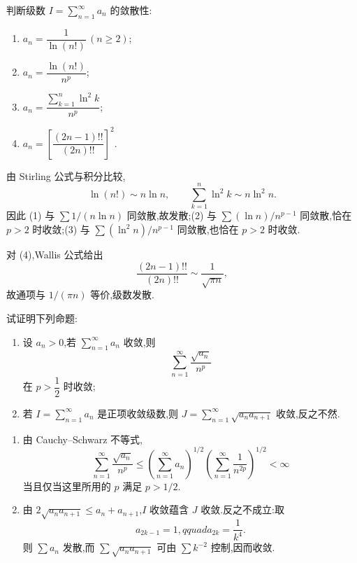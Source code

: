 \begin{example}
    判断级数 $\displaystyle I=\sum\limits_{n=1}^{\infty}a_n$ 的敛散性:
    \begin{enumerate}
        \item $\displaystyle a_n=\dfrac{1}{\ln(n!)}\,(n\geq2)$;
        \item $\displaystyle a_n=\dfrac{\ln(n!)}{n^p}$;
        \item $\displaystyle a_n=\dfrac{\displaystyle\sum\limits_{k=1}^n\ln^2k}{n^p}$;
        \item $\displaystyle a_n=\left[\dfrac{(2n-1)!!}{(2n)!!}\right]^2$.
    \end{enumerate}
\end{example}
\exampleblank

\begin{solution}
    由 Stirling 公式与积分比较,
    \[
        \ln(n!)\sim n\ln n,
        \qquad
        \sum\limits_{k=1}^{n}\ln^2k\sim n\ln^2n.
    \]
    因此 (1) 与 $\displaystyle \sum 1/(n\ln n)$ 同敛散,故发散;(2) 与
    $\displaystyle \sum (\ln n)/n^{p-1}$ 同敛散,恰在 $p>2$ 时收敛;(3) 与
    $\displaystyle \sum (\ln^2n)/n^{p-1}$ 同敛散,也恰在 $p>2$ 时收敛.

    对 (4),Wallis 公式给出
    \[
        \dfrac{(2n-1)!!}{(2n)!!}\sim\dfrac{1}{\sqrt{\pi n}},
    \]
    故通项与 $1/(\pi n)$ 等价,级数发散.
\end{solution}

\begin{example}
    试证明下列命题:
    \begin{enumerate}
        \item 设 $a_n>0$,若 $\displaystyle\sum\limits_{n=1}^{\infty}a_n$ 收敛,则
              \[
                  \displaystyle\sum\limits_{n=1}^{\infty}\dfrac{\sqrt{a_n}}{n^p}
              \]
              在 $p>\dfrac{1}{2}$ 时收敛;
        \item 若 $\displaystyle I=\sum\limits_{n=1}^{\infty}a_n$ 是正项收敛级数,则 $\displaystyle J=\sum\limits_{n=1}^{\infty}\sqrt{a_na_{n+1}}$ 收敛,反之不然.
    \end{enumerate}
\end{example}
\exampleblank

\begin{solution}
    \leavevmode
    \begin{enumerate}
        \item 由 Cauchy--Schwarz 不等式,
              \[
                  \displaystyle\sum\limits_{n=1}^{\infty}\dfrac{\sqrt{a_n}}{n^p}
                  \leq
                  \left(\sum\limits_{n=1}^{\infty}a_n\right)^{1/2}
                  \left(\sum\limits_{n=1}^{\infty}\dfrac{1}{n^{2p}}\right)^{1/2}<\infty
              \]
              当且仅当这里所用的 $p$ 满足 $p>1/2$.
        \item 由 $2\sqrt{a_na_{n+1}}\leq a_n+a_{n+1}$,$I$ 收敛蕴含 $J$ 收敛.反之不成立:取
              \[
                  a_{2k-1}=1,qquad a_{2k}=\dfrac{1}{k^4}.
              \]
              则 $\displaystyle \sum a_n$ 发散,而 $\displaystyle \sum\sqrt{a_na_{n+1}}$ 可由 $\displaystyle \sum k^{-2}$ 控制,因而收敛.
    \end{enumerate}
\end{solution}

